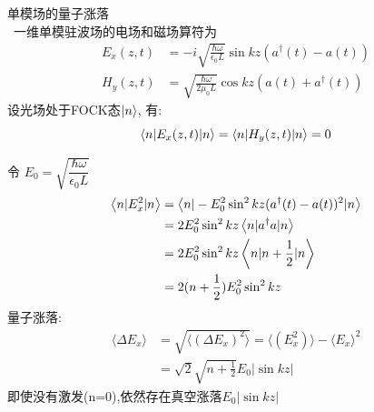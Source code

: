 单模场的量子涨落\\ 
      \解~一维单模驻波场的电场和磁场算符为  
      \[ \begin{aligned}
        E_x(z,t)
        &= -i \sqrt{\frac{\hbar\omega}{\epsilon_0 L}} \sin kz (a^\dagger(t)-a(t) ) \\ 
        H_y(z,t)  
        &= \sqrt{\frac{\hbar\omega}{2 \mu_0 L}} \cos kz (a(t) + a^\dagger(t))
     \end{aligned} \]
     设光场处于FOCK态$\left|n\right\rangle$, 有:
     \[ \left\langle n | E_x(z,t) | n \right\rangle = \left\langle n | H_y(z,t) | n \right\rangle =0\]

     令 $E_0= \sqrt{\dfrac{\hbar\omega}{\epsilon_0 L}}$
     \[ \begin{aligned}
       \left\langle n | E^2_x | n \right\rangle &= \left\langle n | -E^2_0 \sin^2 kz (a^\dagger(t)-a(t))^2 | n \right\rangle \\
       &= 2 E^2_0 \sin^2 kz \left\langle n | a^\dagger a | n \right\rangle \\ 
       &= 2 E^2_0 \sin^2 kz \left\langle n | n+\frac{1}{2} | n \right\rangle \\ 
       &= 2 (n+\frac{1}{2})E^2_0 \sin^2 kz  
    \end{aligned} \]
    量子涨落: 
    \[
   \begin{aligned}
          \langle \Delta E_x\rangle &= \sqrt{\langle (\Delta E_x)^2\rangle} = \langle (E^2_x)\rangle - \langle E_x\rangle ^2 \\
          &= \sqrt{2} \sqrt{n+\frac{1}{2}} E_0 \left|\sin kz \right| 
   \end{aligned} \]
   即使没有激发(n=0),依然存在真空涨落$ E_0 \left|\sin kz \right|  $  

